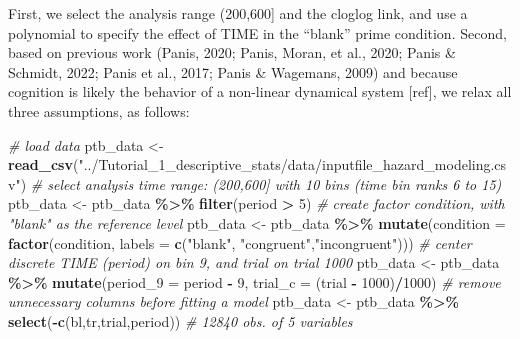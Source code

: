 \documentclass[
  man,floatsintext]{apa6}
\newenvironment{Shaded}{\begin{snugshade}}{\end{snugshade}}
\newcommand{\AttributeTok}[1]{\textcolor[rgb]{0.13,0.29,0.53}{#1}}
\newcommand{\CommentTok}[1]{\textcolor[rgb]{0.56,0.35,0.01}{\textit{#1}}}
\newcommand{\DecValTok}[1]{\textcolor[rgb]{0.00,0.00,0.81}{#1}}
\newcommand{\FunctionTok}[1]{\textcolor[rgb]{0.13,0.29,0.53}{\textbf{#1}}}
\newcommand{\NormalTok}[1]{#1}
\newcommand{\OtherTok}[1]{\textcolor[rgb]{0.56,0.35,0.01}{#1}}
\newcommand{\SpecialCharTok}[1]{\textcolor[rgb]{0.81,0.36,0.00}{\textbf{#1}}}
\newcommand{\StringTok}[1]{\textcolor[rgb]{0.31,0.60,0.02}{#1}}
\begin{document}
First, we select the analysis range (200,600{]} and the cloglog link, and use a polynomial to specify the effect of TIME in the ``blank'' prime condition. Second, based on previous work (Panis, 2020; Panis, Moran, et al., 2020; Panis \& Schmidt, 2022; Panis et al., 2017; Panis \& Wagemans, 2009) and because cognition is likely the behavior of a non-linear dynamical system {[}ref{]}, we relax all three assumptions, as follows:

\scriptsize

\begin{Shaded}
\begin{Highlighting}[]
\CommentTok{\# load data}
\NormalTok{ptb\_data }\OtherTok{\textless{}{-}} \FunctionTok{read\_csv}\NormalTok{(}\StringTok{"../Tutorial\_1\_descriptive\_stats/data/inputfile\_hazard\_modeling.csv"}\NormalTok{)}
\CommentTok{\# select analysis time range: (200,600] with 10 bins (time bin ranks 6 to 15)}
\NormalTok{ptb\_data }\OtherTok{\textless{}{-}}\NormalTok{ ptb\_data }\SpecialCharTok{\%\textgreater{}\%} \FunctionTok{filter}\NormalTok{(period }\SpecialCharTok{\textgreater{}} \DecValTok{5}\NormalTok{)}
\CommentTok{\# create factor condition, with "blank" as the reference level}
\NormalTok{ptb\_data }\OtherTok{\textless{}{-}}\NormalTok{ ptb\_data }\SpecialCharTok{\%\textgreater{}\%} \FunctionTok{mutate}\NormalTok{(}\AttributeTok{condition =} \FunctionTok{factor}\NormalTok{(condition, }\AttributeTok{labels =} \FunctionTok{c}\NormalTok{(}\StringTok{"blank"}\NormalTok{, }\StringTok{"congruent"}\NormalTok{,}\StringTok{"incongruent"}\NormalTok{)))}
\CommentTok{\# center discrete TIME (period) on bin 9, and trial on trial 1000}
\NormalTok{ptb\_data }\OtherTok{\textless{}{-}}\NormalTok{ ptb\_data }\SpecialCharTok{\%\textgreater{}\%} \FunctionTok{mutate}\NormalTok{(}\AttributeTok{period\_9 =}\NormalTok{ period }\SpecialCharTok{{-}} \DecValTok{9}\NormalTok{,}
                                \AttributeTok{trial\_c =}\NormalTok{ (trial }\SpecialCharTok{{-}} \DecValTok{1000}\NormalTok{)}\SpecialCharTok{/}\DecValTok{1000}\NormalTok{)}
\CommentTok{\# remove unnecessary columns before fitting a model}
\NormalTok{ptb\_data }\OtherTok{\textless{}{-}}\NormalTok{ ptb\_data }\SpecialCharTok{\%\textgreater{}\%} \FunctionTok{select}\NormalTok{(}\SpecialCharTok{{-}}\FunctionTok{c}\NormalTok{(bl,tr,trial,period)) }\CommentTok{\# 12840 obs. of 5 variables}
\end{Highlighting}
\end{Shaded}
\end{document}
